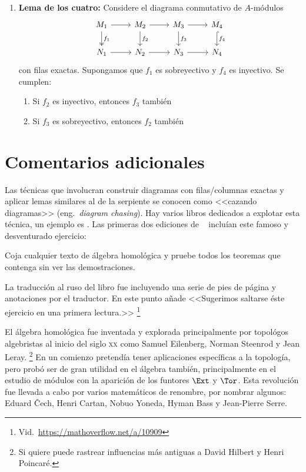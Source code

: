 \documentclass[11pt, reqno]{amsart}
\begin{document}
\begin{enumerate}
	\item \textbf{Lema de los cuatro:}
		Considere el diagrama conmutativo de $A$-módulos
		\[\begin{tikzcd}
			M_1 \dar["f_1", two heads] \rar & M_2 \dar["f_2"] \rar & M_3 \dar["f_3"] \rar & M_4
			\dar["f_4", hook] \\
			N_1 \rar & N_2 \rar & N_3 \rar & N_4
		\end{tikzcd}\]
		con filas exactas.
		Supongamos que $f_1$ es sobreyectivo y $f_4$ es inyectivo.
		Se cumplen:
		\begin{enumerate}
			\item Si $f_2$ es    inyectivo, entonces $f_3$ también
			\item Si $f_3$ es sobreyectivo, entonces $f_2$ también
		\end{enumerate}
\end{enumerate}

\section{Comentarios adicionales}
Las técnicas que involucran construir diagramas con filas/columnas exactas y aplicar lemas similares al de la serpiente
se conocen como <<cazando diagramas>> (eng.\ \emph{diagram chasing}).
Hay varios libros dedicados a explotar esta técnica, un ejemplo es \cite{maclane:homology}.
Las primeras dos ediciones de \citeauthor{lang:algebra}~\cite{lang:algebra} incluían este famoso y desventurado ejercicio:
\begin{displayquote}
	Coja cualquier texto de álgebra homológica y pruebe todos los teoremas que contenga sin ver las demostraciones.
\end{displayquote}
La traducción al ruso del libro fue incluyendo una serie de pies de página y anotaciones por el traductor.
En este punto añade <<Sugerimos saltarse éste ejercicio en una primera lectura.>>%
\footnote{Vid.\ \url{https://mathoverflow.net/a/10909}}

El álgebra homológica fue inventada y explorada principalmente por topológos algebristas al inicio del siglo \textsc{xx}
como Samuel Eilenberg, Norman Steenrod y Jean Leray.%
\footnote{Si quiere puede rastrear influencias más antiguas a David Hilbert y Henri Poincaré.}
En un comienzo pretendía tener aplicaciones específicas a la topología, pero probó ser de gran utilidad en el álgebra
también, principalmente en el estudio de módulos con la aparición de los funtores $\Ext$ y $\Tor$.
Esta revolución fue llevada a cabo por varios matemáticos de renombre, por nombrar algunos: Eduard \v Cech, Henri
Cartan, Nobuo Yoneda, Hyman Bass y Jean-Pierre Serre.


\printbibliography
\end{document}
